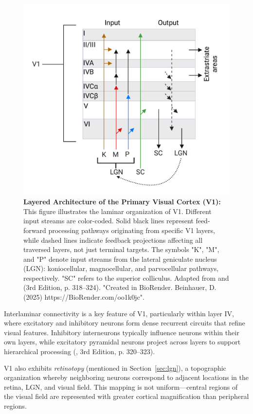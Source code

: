 \begin{figure}
    \centering
    \includegraphics[width=\linewidth]{img/v1_layers.pdf}
    \caption{\textbf{Layered Architecture of the Primary Visual Cortex (V1):} This figure illustrates the laminar organization of V1. Different input streams are color-coded.     Solid black lines represent feed-forward processing pathways originating from specific V1 layers, while dashed lines indicate feedback projections affecting all traversed layers, not just terminal targets. The symbols "K", "M", and "P" denote input streams from the lateral geniculate nucleus (LGN): koniocellular, magnocellular, and parvocellular pathways, respectively. "SC" refers to the superior colliculus. Adapted from \citet{felleman1991distributed} and \citet{bear2020neuroscience} (3rd Edition, p. 318--324). "Created in BioRender. Beinhauer, D. (2025) https://BioRender.com/oo1k0jc".}
    \label{fig:v1_layers}
\end{figure}

Interlaminar connectivity is a key feature of V1, particularly within layer IV, where excitatory and inhibitory neurons form dense recurrent circuits that refine visual features. Inhibitory interneurons typically influence neurons within their own layers, while excitatory pyramidal neurons project across layers to support hierarchical processing (\citet{bear2020neuroscience}, 3rd Edition, p. 320--323).

V1 also exhibits \emph{retinotopy} (mentioned in Section~\ref{sec:lgn}), a topographic organization whereby neighboring neurons correspond to adjacent locations in the retina, LGN, and visual field. This mapping is not uniform—central regions of the visual field are represented with greater cortical magnification than peripheral regions.

